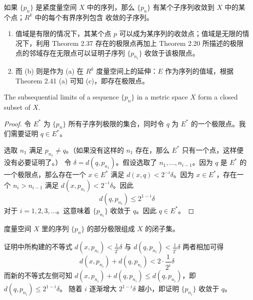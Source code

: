 \documentclass[../poma-notes.tex]{subfiles}
\begin{document}
\begin{anote}
  如果 $\{p_n\}$ 是紧度量空间 $X$ 中的序列，那么 $\{p_n\}$ 有某个子序列收敛到 $X$ 中的某个点；$R^k$ 中的每个有界序列包含
  收敛的子序列。

  \begin{enumerate}[label=(\alph*)]
    \item 值域是有限的情况下，其某个点 $p$ 可以成为某序列的收敛点；值域是无限的情况下，利用 Theorem 2.37 存在的极限点再加上 Theorem 2.20
          所描述的极限点的邻域存在无限点可以证明子序列 $\{p_{n_i}\}$ 收敛于该极限点。
    \item 而 (b) 则是作为 (a) 在 $R^k$ 度量空间上的延伸：$E$ 作为序列的值域，根据 Theorem 2.41 (a) 可知 (c)，即存在极限点。
  \end{enumerate}
\end{anote}

\begin{theorem}
  The subsequential limits of a sequence $\{p_n\}$ in a metric space $X$ form a closed subset of $X$.
\end{theorem}

\begin{proof}
  令 $E^*$ 为 $\{p_n\}$ 所有子序列极限的集合，同时令 $q$ 为 $E^*$ 的一个极限点。我们需要证明 $q \in E^*$。

  选取 $n_1$ 满足 $p_{n_1} \ne q$。（如果没有这样的 $n_1$ 存在，那么 $E^*$ 只有一个点，这样便没有必要证明了。）
  令 $\delta = d(q, p_{n_1})$。假设选取了 $n_1, \dots, n_{i-1}$。因为 $q$ 是 $E^*$ 的一个极限点，那么存在一个 $x\in E^*$
  满足 $d(x,q) < 2^{-i} \delta$。因为 $x \in E^*$，存在一个 $n_i > n_{i-1}$ 满足 $d(x,p_{n_i}) < 2^{-i} \delta$。因此
  \[ d(q, p_{n_i}) \le 2^{1-i} \delta \]
  对于 $i = 1,2,3,\dots$。这意味着 $\{p_{n_i}\}$ 收敛于 $q$。因此 $q \in E^*$。
\end{proof}

\begin{anote}\mbox{}\par
  度量空间 $X$ 里的序列 $\{p_n\}$ 的部分极限组成 $X$ 的闭子集。

  证明中所构建的不等式 $d(x, p_{n_i}) < \frac{1}{2^i} \delta$ 与 $d(q, p_{n_i}) < \frac{1}{2^i} \delta$ 两者相加可得
  \[ d(x, p_{n_i}) + d(q, p_{n_i}) < 2 \cdot \frac{1}{2^i} \delta \]
  而新的不等式左侧可知 $d(x, p_{n_i}) + d(q, p_{n_i}) \le d(q, p_{n_i})$，即 $d(q, p_{n_i}) \le 2^{1-i} \delta$。
  随着 $i$ 逐渐增大 $2^{1-i} \delta$ 越小，即证明 $\{p_{n_i}\}$ 收敛于 $q$。
\end{anote}
\end{document}
